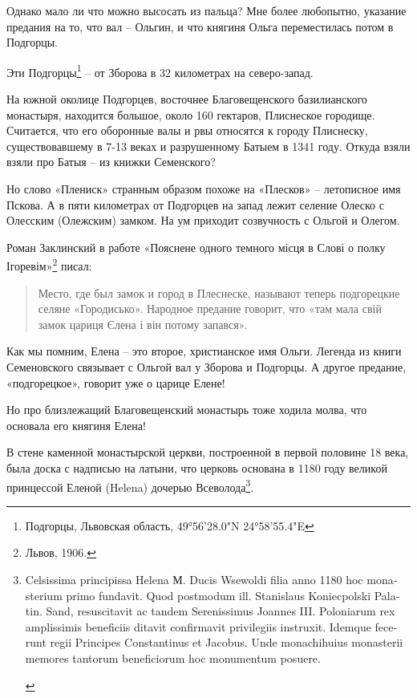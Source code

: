 Однако мало ли что можно высосать из пальца? Мне более любопытно, указание предания на то, что вал – Ольгин, и что княгиня Ольга переместилась потом в Подгорцы.

Эти Подгорцы\footnote{Подгорцы, Львовская область, 49°56'28.0"N 24°58'55.4"E} – от Зборова в 32 километрах на северо-запад. 

На южной околице Подгорцев, восточнее Благовещенского базилианского монастыря, находится большое, около 160 гектаров, Плиснеское городище. Считается, что его оборонные валы и рвы относятся к городу Плиснеску, существовавшему в 7-13 веках и разрушенному Батыем в 1341 году. Откуда взяли взяли про Батыя – из книжки Семенского?

Но слово «Плениск» странным образом похоже на «Плесков» – летописное имя Пскова. А в пяти километрах от Подгорцев на запад лежит селение Олеско с Олесским (Олежским) замком. На ум приходит созвучность с Ольгой и Олегом.

Роман Заклинский в работе «Пояснене одного темного місця в Слові о полку Ігоревім»\footnote{Львов, 1906.} писал:

\begin{quotation}
Место, где был замок и город в Плеснеске, называют теперь подгорецкие селяне «Городисько». Народное предание говорит, что «там мала свій замок цариця Єлена і він потому запався».
\end{quotation}

Как мы помним, Елена – это второе, христианское имя Ольги. Легенда из книги Семеновского связывает с Ольгой вал у Зборова и Подгорцы. А другое предание, «подгорецкое», говорит уже о царице Елене!

Но про близлежащий Благовещенский монастырь тоже ходила молва, что основала его княгиня Елена!

В стене каменной монастырской церкви, построенной в первой половине 18 века, была доска с надписью на латыни, что церковь основана в 1180 году великой принцессой Еленой (Helena) дочерью Всеволода\footnote{\begin{otherlanguage}{latin}Celsissima principissa Helena М. Ducis Wsewoldi filia anno 1180 hoc monasterium primo fundavit. Quod postmodum ill. Stanislaus Koniecpolski Palatin. Sand, resuscitavit ac tandem Serenissimus Joannes III. Poloniarum rex amplissimis beneficiis ditavit confirmavit privilegiis instruxit. Idemque fecerunt regii Principes Constantinus et Jacobus. Unde monachihuius monasterii memores tantorum beneficiorum hoc monumentum posuere.\end{otherlanguage}}.

